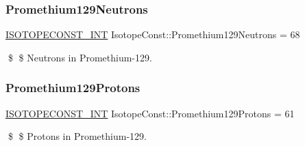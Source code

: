 \subsubsection{\texorpdfstring{Promethium129\+Neutrons}{Promethium129Neutrons}}
{\footnotesize\ttfamily \mbox{\hyperlink{group___isotope_const-_macros_ga5f18360b3e99483a35c32d789e62621c}{I\+S\+O\+T\+O\+P\+E\+C\+O\+N\+S\+T\+\_\+\+I\+NT}} Isotope\+Const\+::\+Promethium129\+Neutrons = 68}

\$ \$ Neutrons in Promethium-\/129. \mbox{\label{group___isotope_const-_promethium-_pm129_ga4ada889facbfb86b763d2572adfb1ded}} 
\subsubsection{\texorpdfstring{Promethium129\+Protons}{Promethium129Protons}}
{\footnotesize\ttfamily \mbox{\hyperlink{group___isotope_const-_macros_ga5f18360b3e99483a35c32d789e62621c}{I\+S\+O\+T\+O\+P\+E\+C\+O\+N\+S\+T\+\_\+\+I\+NT}} Isotope\+Const\+::\+Promethium129\+Protons = 61}

\$ \$ Protons in Promethium-\/129. 